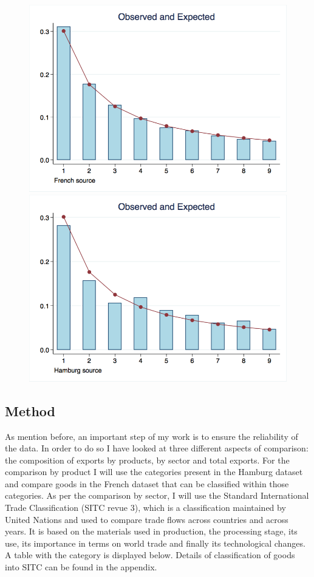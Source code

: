 \documentclass[12pt,a4paper,titlepage,english]{article}
\begin{document}
\begin{figure}
\centering
{}
\includegraphics[scale=.28]{benford_fr.png}
\includegraphics[scale=.28]{benford_hb.png}
\end{figure}





\subsection{Method}
As mention before, an important step of my work is to ensure the reliability of the data. In order to do so I have looked at three different aspects of comparison: the composition of exports by products, by sector and total exports. For the comparison by product I will use the categories present in the Hamburg dataset and compare goods in the French dataset that can be classified within those categories. As per the comparison by sector, I will use the Standard International Trade Classification (SITC revue 3), which is a classification maintained by United Nations and used to compare trade flows across countries and across years. It is based on the materials used in production, the processing stage, its use, its importance in terms on world trade and finally its technological changes.  A table with the category is displayed below. Details of classification of goods into SITC can be found in the appendix.
\end{document}

